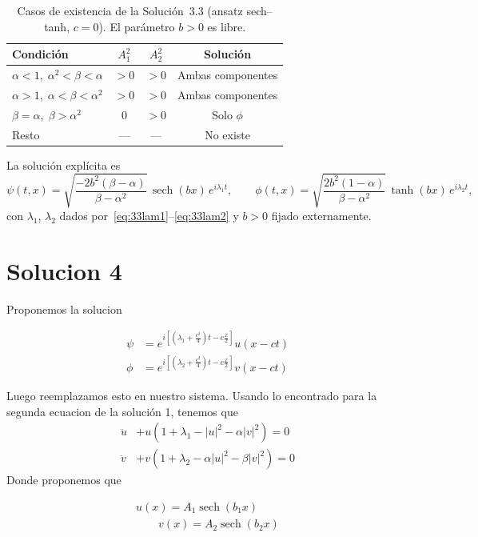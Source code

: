 \documentclass[letterpaper,11pt]{exam}
\newcommand{\sech}{\operatorname{sech}}
\theoremstyle{plain}
\begin{document}
\begin{table}[H]
\centering
\renewcommand{\arraystretch}{1.8}
\begin{tabular}{|p{3.5cm}|c|c|c|}
\hline
\textbf{Condición} & $A_1^2$ & $A_2^2$ & \textbf{Solución} \\
\hline
$\alpha<1,\;\alpha^2<\beta<\alpha$
& $>0$
& $>0$
& Ambas componentes \\
\hline
$\alpha>1,\;\alpha<\beta<\alpha^2$
& $>0$
& $>0$
& Ambas componentes \\
\hline
$\beta=\alpha,\;\beta>\alpha^2$
& $0$
& $>0$
& Solo $\phi$ \\
\hline
Resto & --- & --- & No existe \\
\hline
\end{tabular}
\caption{Casos de existencia de la Solución~3.3 (ansatz sech--tanh, $c=0$).
El parámetro $b>0$ es libre.}
\label{tab:sol33}
\end{table}

\noindent La solución explícita es
\begin{equation*}
    \psi(t,x) = \sqrt{\frac{-2b^2(\beta-\alpha)}{\beta-\alpha^2}}\,
    \operatorname{sech}(bx)\,e^{i\lambda_1 t}, \qquad
    \phi(t,x) = \sqrt{\frac{2b^2(1-\alpha)}{\beta-\alpha^2}}\,
    \tanh(bx)\,e^{i\lambda_2 t},
\end{equation*}
con $\lambda_1$, $\lambda_2$ dados por~\eqref{eq:33lam1}--\eqref{eq:33lam2}
y $b>0$ fijado externamente.

\section{Solucion 4}
Proponemos la solucion 

\begin{align*}
    \psi&=e^{i[(\lambda_1+\frac{c^2}{4})t-c\frac{x}{2}]}u(x-ct) \\
    \phi&=e^{i[(\lambda_2+\frac{c^2}{4})t-c\frac{x}{2}]}v(x-ct) 
\end{align*}

Luego reemplazamos esto en nuestro sistema. Usando lo encontrado para la segunda ecuacion de la solución 1, tenemos que
\begin{align*}
       \ddot{u}&+u (1+\lambda_1-|u|^2-\alpha|v|^2)=0 \\ 
       \ddot{v}&+v (1+\lambda_2-\alpha |u|^2-\beta|v|^2)=0 
\end{align*}
Donde proponemos que 

\begin{align*}
    u(x) = A_1\sech(b_1x) \\
    \qquad v(x) = A_2\sech(b_2x)
\end{align*}
\end{document}
